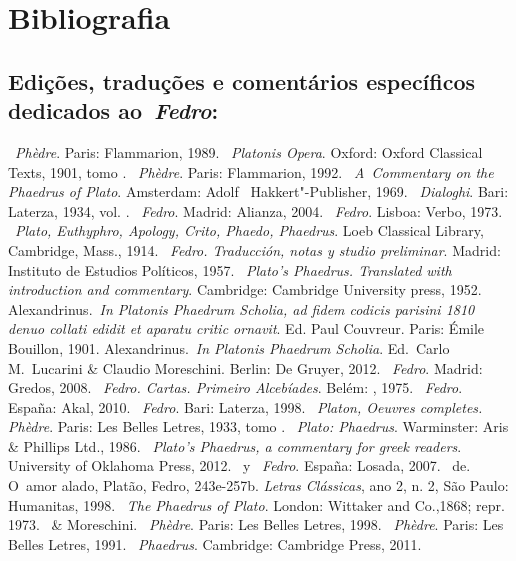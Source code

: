 \chapter{Bibliografia}

\section{Edições, traduções e comentários específicos dedicados
ao~\emph{Fedro}:}

 

\begin{bibliohedra}
~\emph{Phèdre}. Paris: Flammarion, 1989.
~\emph{Platonis Opera}. Oxford: Oxford Classical
  Texts, 1901, tomo .
~\emph{Phèdre}. Paris: Flammarion, 1992.
~\emph{A~Commentary on the Phaedrus of Plato}.
  Amsterdam: Adolf ~Hakkert"-Publisher, 1969.
~\emph{Dialoghi}. Bari: Laterza, 1934, vol. .
~\emph{Fedro}. Madrid: Alianza, 2004.
~\emph{Fedro}. Lisboa: Verbo, 1973.
~\emph{Plato, Euthyphro, Apology, Crito, Phaedo, Phaedrus}. Loeb
  Classical Library, Cambridge, Mass., 1914.
~\emph{Fedro. Traducción, notas y studio preliminar}.
  Madrid: Instituto de Estudios Políticos, 1957.
~\emph{Plato's Phaedrus. Translated with introduction
  and commentary}. Cambridge: Cambridge University press, 1952.
 Alexandrinus.~\emph{In Platonis Phaedrum Scholia, ad fidem
  codicis parisini 1810 denuo collati edidit et aparatu critic ornavit}.
  Ed. Paul Couvreur. Paris: Émile Bouillon, 1901.
 Alexandrinus.~\emph{In Platonis Phaedrum Scholia}. Ed.~Carlo
  M.~Lucarini \& Claudio Moreschini. Berlin: De Gruyer,
  2012.
~\emph{Fedro}. Madrid: Gredos, 2008.
~\emph{Fedro. Cartas. Primeiro Alcebíades}.
  Belém: , 1975.
~\emph{Fedro}. España: Akal,
  2010.
~\emph{Fedro}. Bari: Laterza, 1998.
~\emph{Platon, Oeuvres completes. Phèdre}.
  Paris: Les Belles Letres, 1933, tomo .
~\emph{Plato: Phaedrus}. Warminster: Aris \& Phillips Ltd., 1986.
~\emph{Plato's Phaedrus, a commentary for greek readers}.
  University of Oklahoma Press, 2012.
~y ~\emph{Fedro}. España: Losada, 2007.
~de. O~amor alado, Platão, Fedro, 243e-257b.
  \emph{Letras Clássicas}, ano 2, n. 2, São Paulo: Humanitas, 1998.
~\emph{The Phaedrus of Plato}. London: Wittaker and Co.,1868; repr. 1973.
~\& Moreschini. ~\emph{Phèdre}. Paris: Les Belles Letres,
  1998.
~\emph{Phèdre}. Paris: Les Belles Letres, 1991.
~\emph{Phaedrus}. Cambridge:
  Cambridge Press, 2011.
\end{bibliohedra}

